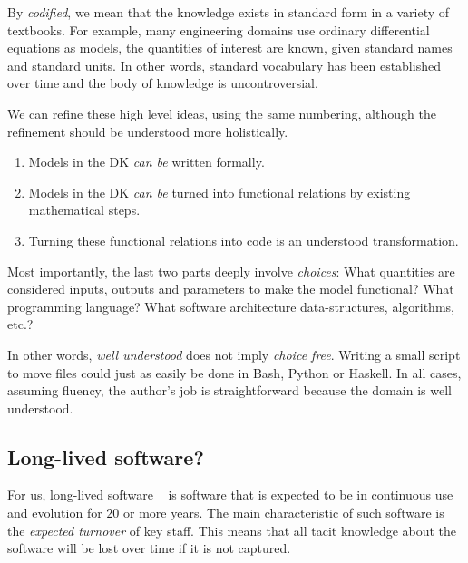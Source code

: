 \documentclass[a4paper,UKenglish,cleveref,autoref,thm-restate]{oasics-v2021}
\begin{document}
By \emph{codified}, we mean that the knowledge exists in standard form in a
variety of textbooks. For example, many engineering domains use ordinary
differential equations as models, the quantities of interest are known, given
standard names and standard units. In other words, standard vocabulary has been
established over time and the body of knowledge is uncontroversial.

We can refine these high level ideas, using the same numbering, although the
refinement should be understood more holistically.
\begin{enumerate}
\item Models in the DK \emph{can be} written formally.
\item Models in the DK \emph{can be} turned into functional relations by
 existing mathematical steps.
\item Turning these functional relations into code is an understood
 transformation.
\end{enumerate}
Most importantly, the last two parts deeply involve \emph{choices}: What
quantities are considered inputs, outputs and parameters to make the model
functional? What programming language?  What software architecture
data-structures, algorithms, etc.?

In other words, \emph{well understood} does not imply \emph{choice free}.
Writing a small script to move files could just as easily be done in Bash,
Python or Haskell. In all cases, assuming fluency, the author's job is
straightforward because the domain is well understood.

\subsection{Long-lived software?}
\label{subsec:long-lived-software}

For us, long-lived software ~\cite{SPL-long-lived} is software that is expected
to be in continuous use and evolution for \(20\) or more years. The main
characteristic of such software is the \emph{expected turnover} of key staff.
This means that all tacit knowledge about the software will be lost over time if
it is not captured.

%
%
\end{document}
